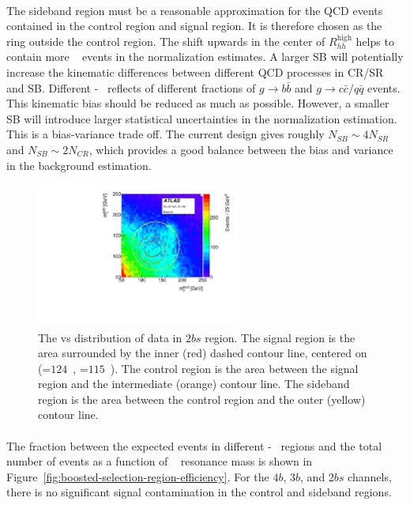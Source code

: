\paragraph{}
The sideband region must be a reasonable approximation for the QCD events contained in the control region and signal region.
It is therefore chosen as the ring outside the control region.
The shift upwards in the center of $R_{hh}^{\text{high}}$ helps to contain more \ttbar~ events in the normalization estimates.
A larger SB will potentially increase the kinematic differences between different QCD processes in CR/SR and SB.
Different \mleadJ-\msublJ~ reflects of different fractions of $g \to b\bar{b}$ and $g \to c\bar{c}/q\bar{q}$ events.
This kinematic bias should be reduced as much as possible.
However, a smaller SB will introduce larger statistical uncertainties in the normalization estimation.
This is a bias-variance trade off.
The current design gives roughly $N_{SB} \sim 4 N_{SR}$ and $N_{SB} \sim 2 N_{CR}$, which provides a good balance between the bias and variance in the background estimation.

\begin{figure}[htb!]
\begin{center}
  \includegraphics[width=0.6\textwidth,angle=-90]{figures/boosted/Other/TwoTag_split_Incl_data_mH0H1.pdf}
  \caption{The \mleadJ vs \msublJ distribution of data in $2bs$ region. The signal region is the area surrounded by the inner (red) dashed contour line, centered on (\mleadJ=$124$~\GeV, \msublJ=$115$~\GeV). The control region is the area between the signal region and the intermediate (orange) contour line. The sideband region is the area between the control region and the outer (yellow) contour line.}
  \label{fig:boosted-region-def}
\end{center}
\end{figure}

\paragraph{}
The fraction between the expected events in different \mleadJ-\msublJ~ regions and the total number of events as a function of \Grav~ resonance mass is shown in Figure~\ref{fig:boosted-selection-region-efficiency}. 
For the $4b$, $3b$, and $2bs$ channels, there is no significant signal contamination in the control and sideband regions.


